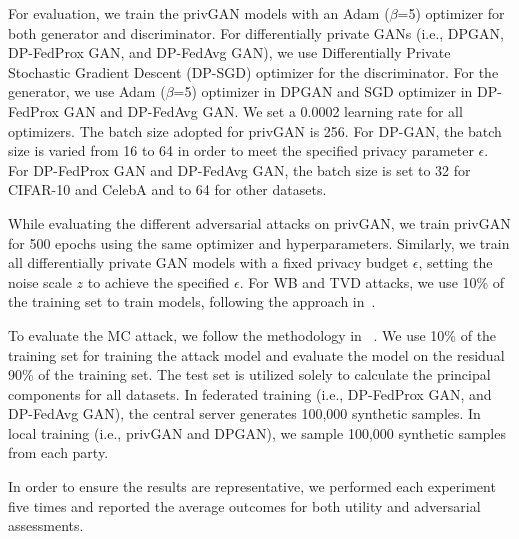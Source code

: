 \documentclass[conference]{IEEEtran}
\begin{document}


For evaluation, we train the privGAN models with an Adam ($\beta$=5) optimizer for both generator and discriminator.  For differentially private GANs (i.e., DPGAN, DP-FedProx GAN, and DP-FedAvg GAN), we use Differentially Private Stochastic Gradient Descent (DP-SGD) optimizer for the discriminator. For the generator, we use  Adam ($\beta$=5) optimizer in DPGAN and SGD optimizer in DP-FedProx GAN and DP-FedAvg GAN.  We set a 0.0002 learning rate for all optimizers.  The batch size adopted for privGAN is 256.  For DP-GAN, the batch size is varied from 16 to 64 in order to meet the specified privacy parameter $\epsilon$.  For DP-FedProx GAN and DP-FedAvg GAN, the batch size is set to 32 for CIFAR-10 and CelebA and to 64 for other datasets.  



While evaluating the different adversarial attacks on privGAN, we train privGAN for 500 epochs using the same optimizer and hyperparameters. Similarly, we train all differentially private GAN models with a fixed privacy budget $\epsilon$, setting the noise scale $z$ to achieve the specified $\epsilon$. For WB and TVD attacks, we use 10\% of the training set to train models, following the approach in~\cite{WBAttack2018}.

 
 To evaluate the MC attack, we follow the methodology in ~\cite{PrivGAN2019, MCAttackHilprecht2019}.  We use 10\% of the training set for training the attack model and evaluate the model on the residual 90\% of the training set.  The test set is utilized solely to calculate the principal components for all datasets.  In federated training (i.e.,  DP-FedProx GAN, and DP-FedAvg GAN), the central server generates 100,000 synthetic samples. In local training (i.e., privGAN and DPGAN), we sample 100,000 synthetic samples from each party. %
 
In order to ensure the results are representative, we performed each experiment five times and reported the average outcomes for both utility and adversarial assessments. %
\end{document}
